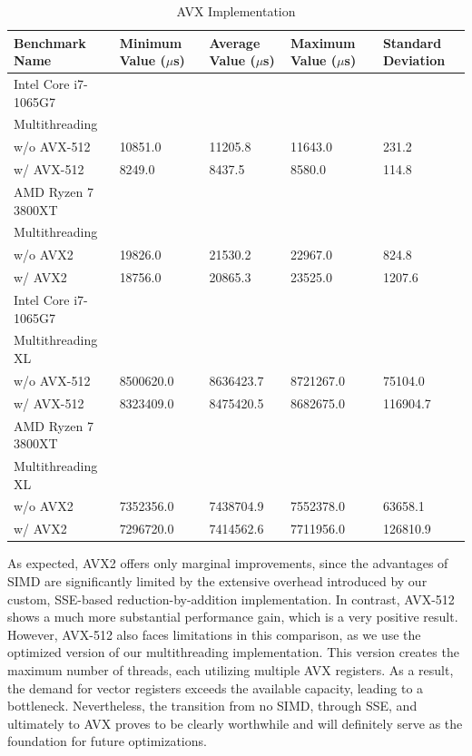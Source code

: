 \documentclass[modern,longauthor]{aastex7}
\begin{document}
\begin{table}[htb!]
\centering
\caption{AVX Implementation\label{tab:avx}}
\begin{tabular}{p{5cm} p{2cm} p{2cm} p{2cm} p{2cm}}
\hline
Benchmark Name & Minimum Value ($\mu$s) & Average Value ($\mu$s) & Maximum Value ($\mu$s) & Standard Deviation \\
\hline
Intel Core i7-1065G7 \\
\hspace{0.5cm}Multithreading \\
\hspace{0.5cm}w/o AVX-512 & 10851.0 & 11205.8 & 11643.0 & 231.2 \\
\hspace{0.5cm}w/ AVX-512 & 8249.0 & 8437.5 & 8580.0 & 114.8 \\
AMD Ryzen 7 3800XT \\
\hspace{0.5cm}Multithreading \\
\hspace{0.5cm}w/o AVX2 & 19826.0 & 21530.2 & 22967.0 & 824.8 \\
\hspace{0.5cm}w/ AVX2 & 18756.0 & 20865.3 & 23525.0 & 1207.6 \\
\hline
Intel Core i7-1065G7 \\
\hspace{0.5cm}Multithreading XL \\
\hspace{0.5cm}w/o AVX-512 & 8500620.0 & 8636423.7 & 8721267.0 & 75104.0 \\
\hspace{0.5cm}w/ AVX-512 & 8323409.0 & 8475420.5 & 8682675.0 & 116904.7 \\
AMD Ryzen 7 3800XT \\
\hspace{0.5cm}Multithreading XL \\
\hspace{0.5cm}w/o AVX2 & 7352356.0 & 7438704.9 & 7552378.0 & 63658.1 \\
\hspace{0.5cm}w/ AVX2 & 7296720.0 & 7414562.6 & 7711956.0 & 126810.9 \\
\hline
\end{tabular}
\end{table}
\FloatBarrier

As expected, AVX2 offers only marginal improvements, since the advantages of SIMD are significantly limited by the extensive overhead introduced by our custom, SSE-based reduction-by-addition implementation. In contrast, AVX-512 shows a much more substantial performance gain, which is a very positive result. However, AVX-512 also faces limitations in this comparison, as we use the optimized version of our multithreading implementation. This version creates the maximum number of threads, each utilizing multiple AVX registers. As a result, the demand for vector registers exceeds the available capacity, leading to a bottleneck. Nevertheless, the transition from no SIMD, through SSE, and ultimately to AVX proves to be clearly worthwhile and will definitely serve as the foundation for future optimizations.
\end{document}
